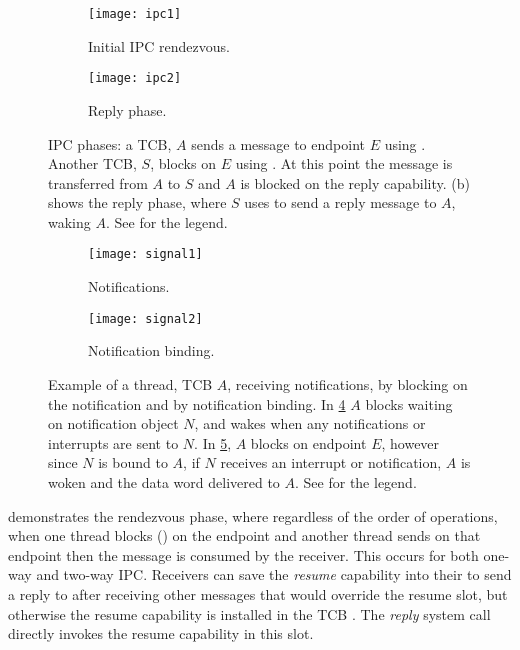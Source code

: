 \begin{figure}
    \centering
    \begin{subfigure}[h]{0.48\textwidth}
        \centering
        \texttt{[image: ipc1]}
        \caption{Initial IPC rendezvous.}
        \label{f:ipc1}
    \end{subfigure}%
    \begin{subfigure}[h]{0.48\textwidth}
        \centering
        \texttt{[image: ipc2]}
        \caption{Reply phase.}
        \label{f:ipc2}
    \end{subfigure}
    \caption[IPC phases.]{IPC phases: a TCB, $A$ sends a message to endpoint $E$ using \call. Another
        TCB, $S$, blocks on $E$ using \recv. At this point the message is transferred from 
        $A$ to $S$ and $A$ is blocked on the reply capability. (b) shows the
    reply phase, where $S$ uses \reply to send a reply message to $A$, waking $A$. See  for the legend.}
    \label{f:ipc}
\end{figure}

\begin{figure}
    \centering
    \begin{subfigure}[h]{0.48\textwidth}
        \centering
        \texttt{[image: signal1]}
        \caption{Notifications.} 
        \label{f:signal1}
    \end{subfigure}%
    \begin{subfigure}[h]{0.48\textwidth}
        \centering
        \texttt{[image: signal2]}
        \caption{Notification binding.}
        \label{f:signal2}
    \end{subfigure}
    \caption[Notification illustrations.]{Example of a thread, TCB $A$, receiving notifications, by blocking on the notification and by
        notification binding. In \cref{f:signal1} $A$ blocks waiting on notification
        object $N$, and wakes when any notifications or interrupts are sent to $N$. In
        \cref{f:signal2}, $A$ blocks on endpoint $E$, however since
        $N$ is bound to $A$, if $N$ receives an interrupt or notification,
        $A$ is woken and the data word delivered to $A$.
        See  for the legend.}
    \label{f:signal}
\end{figure}

 demonstrates the rendezvous phase, where regardless of the order of operations, 
when one thread blocks (\recv) on the endpoint and another thread sends on that endpoint
then the message is consumed by the receiver. This occurs for both one-way and two-way \gls{IPC}.
Receivers can save
the \emph{resume} capability into their \cspace to send a reply to after receiving other messages
that would override the resume slot, but otherwise the resume capability is
installed in the \gls{TCB} \cnode. The \emph{reply} system call directly invokes the resume
capability in this slot. 

